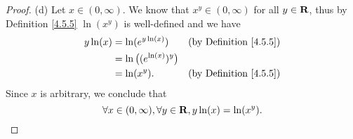 \begin{proof}{(d)}
    Let \(x \in (0, \infty)\).
    We know that \(x^y \in (0, \infty)\) for all \(y \in \mathbf{R}\), thus by Definition \ref{4.5.5} \(\ln(x^y)\) is well-defined and we have
    \begin{align*}
        y \ln(x) & = \ln(e^{y \ln(x)})             & \text{(by Definition \ref{4.5.5})} \\
                 & = \ln\big((e^{\ln(x)})^{y}\big)                                      \\
                 & = \ln(x^y).                     & \text{(by Definition \ref{4.5.5})}
    \end{align*}
    Since \(x\) is arbitrary, we conclude that
    \[
        \forall x \in (0, \infty), \forall y \in \mathbf{R}, y \ln(x) = \ln(x^y).
    \]
\end{proof}

